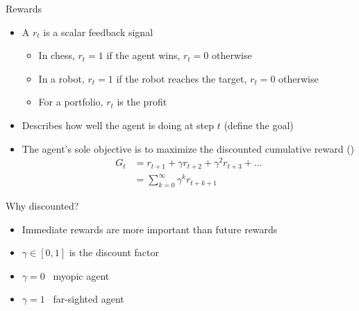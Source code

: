 \documentclass[presentation, 9pt]{beamer}\mode<presentation>{\usetheme{AMSBolognaFC}}
\begin{document}
\begin{frame}{Rewards}
\begin{itemize}
	\item A  $r_t$ is a scalar feedback signal
	\begin{itemize}
		\item In chess, $r_t = 1$ if the agent wins, $r_t = 0$ otherwise
		\item In a robot, $r_t = 1$ if the robot reaches the target, $r_t = 0$ otherwise
		\item For a portfolio, $r_t$ is the profit
	\end{itemize}
	\item Describes how well the agent is doing at step $t$ (define the goal)
	\item The agent's sole objective is to maximize the discounted cumulative reward ()
	\begin{equation*}
	\begin{split}
		G_t & = r_{t+1} + \gamma r_{t+2} + \gamma^2 r_{t+3} + \dots \\
		 & = \sum_{k=0}^{\infty} \gamma^k r_{t+k+1}
		\end{split}
	\end{equation*}
\end{itemize}
\begin{alertblock}{Why discounted?}
\begin{itemize}
	\item Immediate rewards are more important than future rewards
	\item $\gamma \in [0,1]$ is the discount factor
	\item $\gamma = 0$ \faArrowRight \, myopic agent
	\item $\gamma = 1$ \faArrowRight \, far-sighted agent
\end{itemize}
\end{alertblock}
\end{frame}
\end{document}
